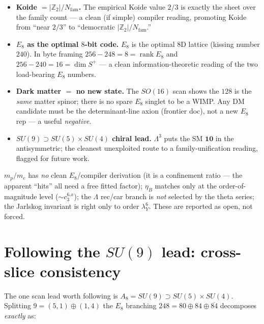 \documentclass[11pt,a4paper]{article}
\newcommand{\Nfam}{N_{\mathrm{fam}}}
\newcommand{\cthree}{c_3}
\newcommand{\Z}{\mathbb{Z}}
\newcommand{\lamY}{\lambda_Y}
\theoremstyle{definition}
\begin{document}
\begin{winbox}
\begin{itemize}\setlength\itemsep{2pt}
\item\textbf{Koide $=|\Z_2|/\Nfam$.} The empirical Koide value $2/3$ is exactly the sheet over the family
count --- a clean (if simple) compiler reading, promoting Koide from ``near $2/3$'' to ``democratic
$|\Z_2|/\Nfam$.''
\item\textbf{$E_8$ as the optimal $8$-bit code.} $E_8$ is the optimal $8$D lattice (kissing number $240$).
In byte framing $256{-}248=8=\operatorname{rank}E_8$ and $256{-}240=16=\dim S^+$ --- a clean
information-theoretic reading of the two load-bearing $E_8$ numbers.
\item\textbf{Dark matter $=$ no new state.} The $SO(16)$ scan shows the $128$ is the \emph{same} matter
spinor; there is no spare $E_8$ singlet to be a WIMP. Any DM candidate must be the determinant-line
axion (frontier doc), not a new $E_8$ rep --- a useful \emph{negative}.
\item\textbf{$SU(9)\supset SU(5){\times}SU(4)$ chiral lead.} $\Lambda^3$ puts the SM $\mathbf{10}$ in the
antisymmetric; the cleanest unexploited route to a family-unification reading, flagged for future work.
\end{itemize}
\end{winbox}

\begin{gapbox}
$m_p/m_e$ has \emph{no} clean $E_8$/compiler derivation (it is a confinement ratio --- the apparent
``hits'' all need a free fitted factor); $\eta_B$ matches only at the order-of-magnitude level
($\sim\cthree^{6.x}$); the $\Lambda$ rec/car branch is \emph{not} selected by the theta series; the
Jarlskog invariant is right only to order $\lamY^6$. These are reported as open, not forced.
\end{gapbox}

\section{Following the $SU(9)$ lead: cross-slice consistency}
The one scan lead worth following is $A_8=SU(9)\supset SU(5)\times SU(4)$. Splitting $9=(5,1)\oplus(1,4)$
the $E_8$ branching $248=80\oplus84\oplus\overline{84}$ decomposes \emph{exactly} as:
\end{document}
